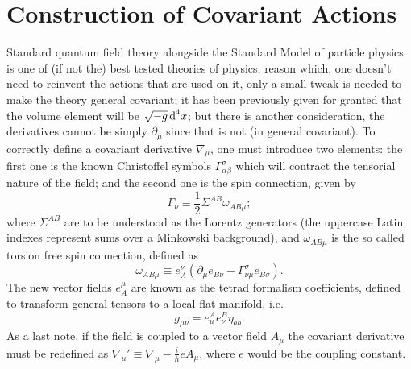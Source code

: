 \section{Construction of Covariant Actions}
Standard quantum field theory alongside the Standard Model of particle physics is one of (if not the) best tested theories of physics, reason which, one doesn't need to reinvent the actions that are used on it, only a small tweak is needed to make the theory general covariant; it has been previously given for granted that the  volume element will be $\sqrt{-g}\,\text{d}^4x$; but there is another consideration, the derivatives cannot be simply $\partial_\mu$ since that is not (in general covariant). To correctly define a covariant derivative $\nabla_\mu$, one must introduce two elements: the first one is the known Christoffel symbols $\Gamma_{\alpha\beta}^\sigma$ which will contract the tensorial nature of the field; and the second one is the spin connection, given by
\begin{equation}
	\Gamma_\nu\equiv \frac{1}{2}\Sigma^{AB}\omega_{AB\mu};
\end{equation}
where $\Sigma^{AB}$ are to be understood as the Lorentz generators (the uppercase Latin indexes represent sums over a Minkowski background), and $\omega_{AB\mu}$ is the so called torsion free spin connection, defined as
\begin{equation}
	\omega_{AB\mu}\equiv e^\nu_A\left(\partial_\mu e_{B\nu}-\Gamma^\sigma_{\nu\mu}e_{B\sigma}\right).
\end{equation}
The new vector fields $e^\mu_A$ are known as the tetrad formalism coefficients, defined to transform general tensors to a local flat manifold, i.e.
\begin{equation}
	g_{\mu\nu}=e^A_\mu e^B_\nu \eta_{ab}.
\end{equation}
As a last note, if the field is coupled to a vector field $A_\mu$ the covariant derivative must be redefined as $\nabla_\mu'\equiv\nabla_\mu-\frac{i}{\hbar}eA_\mu$, where $e$ would be the coupling constant.

